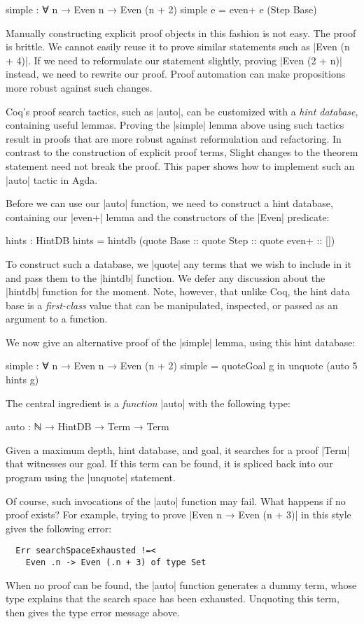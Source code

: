 \documentclass[preprint]{sigplanconf}
\begin{document}
\begin{code}
  simple : ∀ {n} → Even n → Even (n + 2)
  simple e = even+ e (Step Base)
\end{code}
Manually constructing explicit proof objects
in this fashion is not easy. The proof is brittle. We cannot easily
reuse it to prove similar statements such as |Even (n + 4)|. If we
need to reformulate our statement slightly, proving |Even (2 + n)|
instead, we need to rewrite our proof. Proof automation can make
propositions more robust against such changes.

Coq's proof search tactics, such as |auto|, can be customized with a
\emph{hint database}, containing useful lemmas. Proving the |simple|
lemma above using such tactics result in proofs that are more robust
against reformulation and refactoring. In contrast to the construction
of explicit proof terms, Slight changes to the theorem statement need
not break the proof. This paper shows how to implement such an |auto|
tactic in Agda.

Before we can use our |auto| function, we need to construct a hint
database, containing our |even+| lemma and the constructors of the
|Even| predicate:
\begin{code}
  hints : HintDB
  hints = hintdb
    (quote Base :: quote Step :: quote even+ :: [])
\end{code}
To construct such a database, we |quote| any terms that we wish to
include in it and pass them to the |hintdb| function.  We
defer any discussion about the |hintdb| function for the moment. Note,
however, that unlike Coq, the hint data base is a \emph{first-class}
value that can be manipulated, inspected, or passed as an argument to
a function.

We now give an alternative proof of the |simple| lemma, using this
hint database:
\begin{code}
  simple : ∀ {n} → Even n → Even (n + 2)
  simple = quoteGoal g in unquote (auto 5 hints g)
\end{code}
The central ingredient is a \emph{function} |auto| with the following
type:
\begin{code}
  auto : ℕ → HintDB → Term → Term  
\end{code}
Given a maximum depth, hint database, and goal, it searches for a
proof |Term| that witnesses our goal. If this term can be found, it is
spliced back into our program using the |unquote| statement.

Of course, such invocations of the |auto| function may fail. What
happens if no proof exists? For example, trying to prove |Even n →
Even (n + 3)| in this style gives the following error:
\begin{verbatim}
  Err searchSpaceExhausted !=<
    Even .n -> Even (.n + 3) of type Set
\end{verbatim}
When no proof can be found, the |auto| function generates a dummy
term, whose type explains that the search space has been
exhausted. Unquoting this term, then gives the type error message
above.
\end{document}
